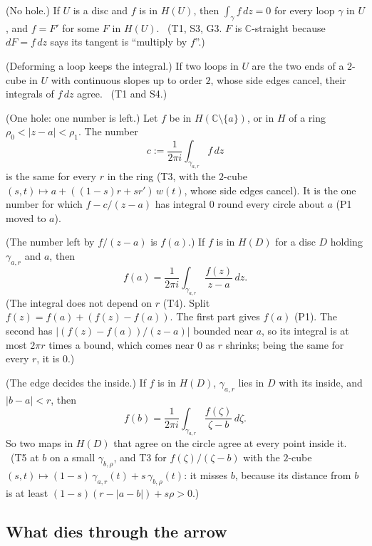 \begin{lines}
\item[\lab{T2}] (No hole.) If $U$ is a disc and $f$ is in $H(U)$, then $\int_\gamma f\,dz = 0$ for every loop $\gamma$ in $U$, and $f = F'$ for some $F$ in $H(U)$. \ (T1, S3, G3. $F$ is $\mathbb{C}$-straight because $dF = f\,dz$ says its tangent is ``multiply by $f$''.)
\item[\lab{T3}] (Deforming a loop keeps the integral.) If two loops in $U$ are the two ends of a $2$-cube in $U$ with continuous slopes up to order $2$, whose side edges cancel, their integrals of $f\,dz$ agree. \ (T1 and S4.)
\item[\lab{T4}] (One hole: one number is left.) Let $f$ be in $H(\mathbb{C} \setminus \{a\})$, or in $H$ of a ring $\rho_0 < |z - a| < \rho_1$. The number \[ c := \frac{1}{2\pi i} \int_{\gamma_{a,r}} f\,dz \] is the same for every $r$ in the ring (T3, with the $2$-cube $(s, t) \mapsto a + ((1 - s) r + s r')\,w(t)$, whose side edges cancel). It is the one number for which $f - c/(z - a)$ has integral $0$ round every circle about $a$ (P1 moved to $a$).
\item[\lab{T5}] (The number left by $f/(z - a)$ is $f(a)$.) If $f$ is in $H(D)$ for a disc $D$ holding $\gamma_{a,r}$ and $a$, then \[ f(a) = \frac{1}{2\pi i} \int_{\gamma_{a,r}} \frac{f(z)}{z - a}\,dz . \] (The integral does not depend on $r$ (T4). Split $f(z) = f(a) + (f(z) - f(a))$. The first part gives $f(a)$ (P1). The second has $|(f(z) - f(a))/(z - a)|$ bounded near $a$, so its integral is at most $2\pi r$ times a bound, which comes near $0$ as $r$ shrinks; being the same for every $r$, it is $0$.)
\item[\lab{T6}] (The edge decides the inside.) If $f$ is in $H(D)$, $\gamma_{a,r}$ lies in $D$ with its inside, and $|b - a| < r$, then \[ f(b) = \frac{1}{2\pi i} \int_{\gamma_{a,r}} \frac{f(\zeta)}{\zeta - b}\,d\zeta . \] So two maps in $H(D)$ that agree on the circle agree at every point inside it. \ (T5 at $b$ on a small $\gamma_{b,\rho}$, and T3 for $f(\zeta)/(\zeta - b)$ with the $2$-cube $(s, t) \mapsto (1 - s)\,\gamma_{a,r}(t) + s\,\gamma_{b,\rho}(t)$: it misses $b$, because its distance from $b$ is at least $(1 - s)(r - |a - b|) + s\rho > 0$.)
\end{lines}

\subsection*{What dies through the arrow}


